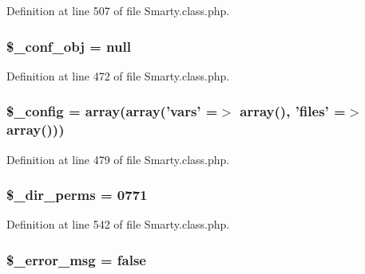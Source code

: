 \-Definition at line 507 of file \-Smarty.\-class.\-php.

\hypertarget{class_smarty_a6c93acd86cae18c4630b272433b2e543}{
\subsubsection[{\$\-\_\-conf\-\_\-obj}]{\setlength{\rightskip}{0pt plus 5cm}\$\-\_\-conf\-\_\-obj = null}}\label{class_smarty_a6c93acd86cae18c4630b272433b2e543}


\-Definition at line 472 of file \-Smarty.\-class.\-php.

\hypertarget{class_smarty_a4d4ad4af1600438042f93a4492f8dbbe}{
\subsubsection[{\$\-\_\-config}]{\setlength{\rightskip}{0pt plus 5cm}\$\-\_\-config = array(array('vars' =$>$ array(), 'files' =$>$ array()))}}\label{class_smarty_a4d4ad4af1600438042f93a4492f8dbbe}


\-Definition at line 479 of file \-Smarty.\-class.\-php.

\hypertarget{class_smarty_a917cec287e9c00b1c188e4a815b279b2}{
\subsubsection[{\$\-\_\-dir\-\_\-perms}]{\setlength{\rightskip}{0pt plus 5cm}\$\-\_\-dir\-\_\-perms = 0771}}\label{class_smarty_a917cec287e9c00b1c188e4a815b279b2}


\-Definition at line 542 of file \-Smarty.\-class.\-php.

\hypertarget{class_smarty_a9936a2e534940a7b7e9c8b85b6966d83}{
\subsubsection[{\$\-\_\-error\-\_\-msg}]{\setlength{\rightskip}{0pt plus 5cm}\$\-\_\-error\-\_\-msg = false}}\label{class_smarty_a9936a2e534940a7b7e9c8b85b6966d83}


